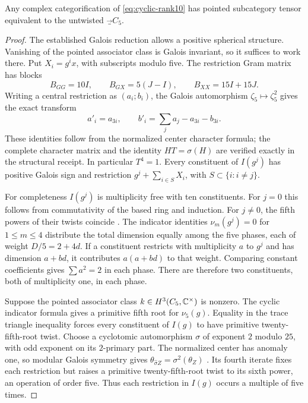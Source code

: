 \begin{proposition}\label{prop:cyclic-associator}
Any complex categorification of \eqref{eq:cyclic-rank10} has pointed
subcategory tensor equivalent to the untwisted $\Vec_{C_5}$.
\end{proposition}
\begin{proof}
The established Galois reduction allows a positive spherical structure.
Vanishing of the pointed associator class is Galois invariant, so it
suffices to work there. Put $X_i=g^ix$, with subscripts modulo five.
The restriction Gram matrix has blocks
\[
 B_{GG}=10I,\qquad B_{GX}=5(J-I),\qquad B_{XX}=15I+15J.
\]
Writing a central restriction as $(a_i;b_i)$, the Galois automorphism
$\zeta_5\mapsto\zeta_5^2$ gives the exact transform
\[
 a'_i=a_{3i},\qquad b'_i=\sum_j a_j-a_{3i}-b_{3i}.
\]
These identities follow from the normalized center character formula;
the complete character matrix and the identity $HT=\sigma(H)$ are
verified exactly in the structural receipt. In particular $T^4=1$.
Every constituent of $I(g^j)$ has positive Galois sign and restriction
$g^j+\sum_{i\in S}X_i$, with $S\subset\{i:i\ne j\}$.

For completeness $I(g^j)$ is multiplicity free with ten constituents.
For $j=0$ this follows from commutativity of the based ring and induction.
For $j\ne0$, the fifth powers of their twists coincide
\cite[Proposition~3.8]{Schopieray}. The indicator identities
$\nu_m(g^j)=0$ for $1\leq m\leq4$ distribute the total dimension
equally among the five phases, each of weight $D/5=2+4d$.
If a constituent restricts with multiplicity $a$ to $g^j$ and has
dimension $a+bd$, it contributes $a(a+bd)$ to that weight. Comparing
constant coefficients gives $\sum a^2=2$ in each phase. There are
therefore two constituents, both of multiplicity one, in each phase.

Suppose the pointed associator class $k\in H^3(C_5,\mathbb C^\times)$ is
nonzero. The cyclic indicator formula \cite[Section~3.3]{MignardSchauenburg}
gives a primitive fifth root for $\nu_5(g)$. Equality in the trace
triangle inequality forces every constituent of $I(g)$ to have
primitive twenty-fifth-root twist. Choose a cyclotomic automorphism
$\sigma$ of exponent $2$ modulo $25$, with odd exponent on its
$2$-primary part. The normalized center has anomaly one, so modular
Galois symmetry gives
$\theta_{\widehat\sigma Z}=\sigma^2(\theta_Z)$
\cite[Theorem~2.9]{RankFinite}. Its fourth iterate fixes each restriction
but raises a primitive twenty-fifth-root twist to its sixth power,
an operation of order five. Thus each restriction in $I(g)$ occurs
a multiple of five times.


\end{proof}
